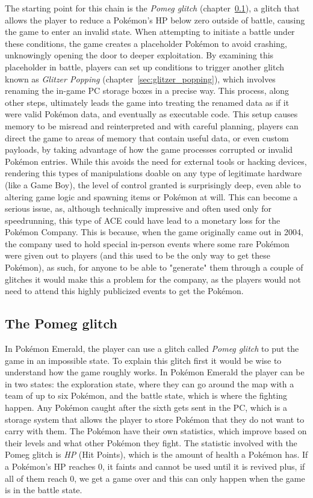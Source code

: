 \documentclass[a4paper]{usiinfbachelorproject}
\begin{document}
The starting point for this chain is the \textit{Pomeg glitch} (chapter~\ref{sec:pomeg_glitch}), a glitch that allows the player to reduce a Pokémon’s HP below zero outside of battle, causing the game to enter an invalid state. When attempting to initiate a battle under these conditions, the game creates a placeholder Pokémon to avoid crashing, unknowingly opening the door to deeper exploitation. By examining this placeholder in battle, players can set up conditions to trigger another glitch known as \textit{Glitzer Popping} (chapter~\ref{sec:glitzer_popping}), which involves renaming the in-game PC storage boxes in a precise way. This process, along other steps, ultimately leads the game into treating the renamed data as if it were valid Pokémon data, and eventually as executable code.
This setup causes memory to be misread and reinterpreted and with careful planning, players can direct the game to areas of memory that contain useful data, or even custom payloads, by taking advantage of how the game processes corrupted or invalid Pokémon entries. While this avoids the need for external tools or hacking devices, rendering this types of manipulations doable on any type of legitimate hardware (like a Game Boy), the level of control granted is surprisingly deep, even able to altering game logic and spawning items or Pokémon at will.
This can become a serious issue, as, although technically impressive and often used only for speedrunning, this type of ACE could have lead to a monetary loss for the Pokémon Company. This is because, when the game originally came out in 2004, the company used to hold special in-person events where some rare Pokémon were given out to players (and this used to be the only way to get these Pokémon), as such, for anyone to be able to "generate" them through a couple of glitches it would make this a problem for the company, as the players would not need to attend this highly publicized events to get the Pokémon.


\subsection{The Pomeg glitch}
\label{sec:pomeg_glitch}
In Pokémon Emerald, the player can use a glitch called \textit{Pomeg glitch} to put the game in an impossible state. To explain this glitch first it would be wise to understand how the game roughly works. In Pokémon Emerald the player can be in two states: the exploration state, where they can go around the map with a team of up to six Pokémon, and the battle state, which is where the fighting happen. Any Pokémon caught after the sixth gets sent in the PC, which is a storage system that allows the player to store Pokémon that they do not want to carry with them. The Pokémon have their own statistics, which improve based on their levels and what other Pokémon they fight. The statistic involved with the Pomeg glitch is \textit{HP} (Hit Points), which is the amount of health a Pokémon has. If a Pokémon's HP reaches 0, it faints and cannot be used until it is revived plus, if all of them reach 0, we get a game over and this can only happen when the game is in the battle state.
\end{document}

